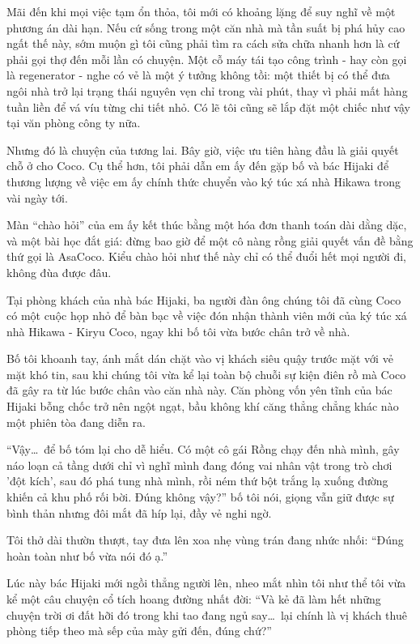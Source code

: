 \documentclass[../main.tex]{subfiles}
\begin{document}
Mãi đến khi mọi việc tạm ổn thỏa, tôi mới có khoảng lặng để suy nghĩ về một phương án dài hạn. Nếu cứ sống trong một căn nhà mà tần suất bị phá hủy cao ngất thế này, sớm muộn gì tôi cũng phải tìm ra cách sửa chữa nhanh hơn là cứ phải gọi thợ đến mỗi lần có chuyện. Một cỗ máy tái tạo công trình - hay còn gọi là regenerator - nghe có vẻ là một ý tưởng không tồi: một thiết bị có thể đưa ngôi nhà trở lại trạng thái nguyên vẹn chỉ trong vài phút, thay vì phải mất hàng tuần liền để vá víu từng chi tiết nhỏ. Có lẽ tôi cũng sẽ lắp đặt một chiếc như vậy tại văn phòng công ty nữa.

Nhưng đó là chuyện của tương lai. Bây giờ, việc ưu tiên hàng đầu là giải quyết chỗ ở cho Coco. Cụ thể hơn, tôi phải dẫn em ấy đến gặp bố và bác Hijaki để thương lượng về việc em ấy chính thức chuyển vào ký túc xá nhà Hikawa trong vài ngày tới.

Màn ``chào hỏi'' của em ấy kết thúc bằng một hóa đơn thanh toán dài dằng dặc, và một bài học đắt giá: đừng bao giờ để một cô nàng rồng giải quyết vấn đề bằng thứ gọi là AsaCoco. Kiểu chào hỏi như thế này chỉ có thể đuổi hết mọi người đi, không đùa được đâu.

\il

Tại phòng khách của nhà bác Hijaki, ba người đàn ông chúng tôi đã cùng Coco có một cuộc họp nhỏ để bàn bạc về việc đón nhận thành viên mới của ký túc xá nhà Hikawa - Kiryu Coco, ngay khi bố tôi vừa bước chân trở về nhà.

Bố tôi khoanh tay, ánh mắt dán chặt vào vị khách siêu quậy trước mặt với vẻ mặt khó tin, sau khi chúng tôi vừa kể lại toàn bộ chuỗi sự kiện điên rồ mà Coco đã gây ra từ lúc bước chân vào căn nhà này. Căn phòng vốn yên tĩnh của bác Hijaki bỗng chốc trở nên ngột ngạt, bầu không khí căng thẳng chẳng khác nào một phiên tòa đang diễn ra.

``Vậy\dots\ để bố tóm lại cho dễ hiểu. Có một cô gái Rồng chạy đến nhà mình, gây náo loạn cả tầng dưới chỉ vì nghĩ mình đang đóng vai nhân vật trong trò chơi 'đột kích', sau đó phá tung nhà mình, rồi ném thứ bột trắng lạ xuống đường khiến cả khu phố rối bời. Đúng không vậy?'' bố tôi nói, giọng vẫn giữ được sự bình thản nhưng đôi mắt đã híp lại, đầy vẻ nghi ngờ.

Tôi thở dài thườn thượt, tay đưa lên xoa nhẹ vùng trán đang nhức nhối: ``Đúng hoàn toàn như bố vừa nói đó ạ.''

Lúc này bác Hijaki mới ngồi thẳng người lên, nheo mắt nhìn tôi như thể tôi vừa kể một câu chuyện cổ tích hoang đường nhất đời: ``Và kẻ đã làm hết những chuyện trời ơi đất hỡi đó trong khi tao đang ngủ say\dots\ lại chính là vị khách thuê phòng tiếp theo mà sếp của mày gửi đến, đúng chứ?''
\end{document}
